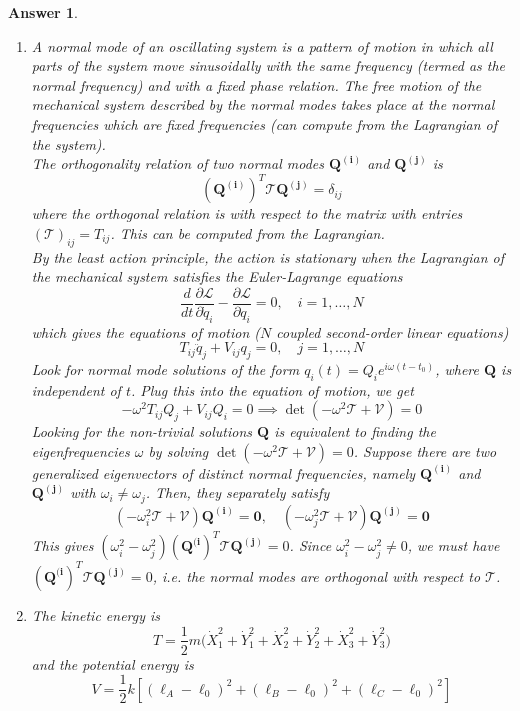 \documentclass[a4paper]{article}
\newtheorem{ans}{Answer}[section]
\theoremstyle{new}
\begin{document}
\begin{ans}\leavevmode
\begin{enumerate}[label=(\roman*)]
\item A normal mode of an oscillating system is a pattern of motion in which all parts of the system move sinusoidally with the same frequency (termed as the normal frequency) and with a fixed phase relation. The free motion of the mechanical system described by the normal modes takes place at the normal frequencies which are fixed frequencies (can compute from the Lagrangian of the system).\\[5pt]
The orthogonality relation of two normal modes $\mathbf{Q^{(i)}}$ and $\mathbf{Q^{(j)}}$ is 
$$(\mathbf{Q^{(i)}})^T\mathcal{T}\mathbf{Q^{(j)}}=\delta_{ij}$$
where the orthogonal relation is with respect to the matrix with entries $(\mathcal{T})_{ij}=T_{ij}$. This can be computed from the Lagrangian.\\[5pt]
By the least action principle, the action is stationary when the Lagrangian of the mechanical system satisfies the Euler-Lagrange equations
$$\frac{d}{dt}\frac{\partial\mathcal{L}}{\partial\dot{q}_i}-\frac{\partial\mathcal{L}}{\partial q_i}=0,\quad i=1,\dots,N$$
which gives the equations of motion ($N$ coupled second-order linear equations)
$$T_{ij}\ddot{q}_{j}+V_{ij}q_j=0,\quad j=1,\dots,N$$
Look for normal mode solutions of the form $q_i(t)=Q_ie^{i\omega(t-t_0)}$, where $\mathbf{Q}$ is independent of $t$. Plug this into the equation of motion, we get
$$-\omega^2T_{ij}Q_j+V_{ij}Q_i=0\implies\det(-\omega^2\mathcal{T}+\mathcal{V})=0$$
Looking for the non-trivial solutions $\mathbf{Q}$ is equivalent to finding the eigenfrequencies $\omega$ by solving $\det(-\omega^2\mathcal{T}+\mathcal{V})=0$. Suppose there are two generalized eigenvectors of distinct normal frequencies, namely $\mathbf{Q^{(i)}}$ and $\mathbf{Q^{(j)}}$ with $\omega_i\neq\omega_j$. Then, they separately satisfy
$$(-\omega_i^2\mathcal{T}+\mathcal{V})\mathbf{Q^{(i)}}=\boldsymbol{0},\quad(-\omega_j^2\mathcal{T}+\mathcal{V})\mathbf{Q^{(j)}}=\boldsymbol{0}$$
This gives $(\omega_i^2-\omega_j^2)(\mathbf{Q^{(i}})^T\mathcal{T}\mathbf{Q^{(j)}}=0$. Since $\omega_i^2-\omega_j^2\neq 0$, we must have $(\mathbf{Q^{(i}})^T\mathcal{T}\mathbf{Q^{(j)}}=0$, i.e. the normal modes are orthogonal with respect to $\mathcal{T}$.
\item The kinetic energy is
$$T=\frac{1}{2}m\bigg(\dot{X}_1^2+\dot{Y}_1^2+\dot{X}_2^2+\dot{Y}_2^2+\dot{X}_3^2+\dot{Y}_3^2\bigg)$$
and the potential energy is
$$V=\frac{1}{2}k[(\ell_A-\ell_0)^2+(\ell_B-\ell_0)^2+(\ell_C-\ell_0)^2]$$

\end{enumerate}
\end{ans}
\end{document}
